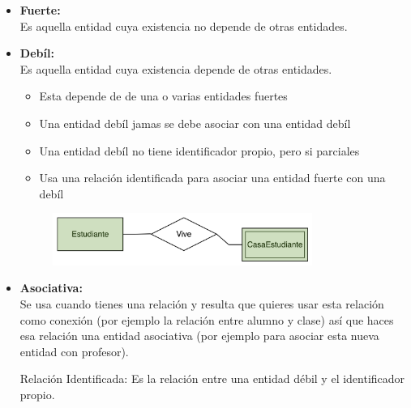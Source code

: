 \documentclass[12pt, fleqn]{report}                             %
\begin{document}
            \begin{itemize}
                \item \textbf{Fuerte:}\\
                    Es aquella entidad cuya existencia no depende de otras entidades.
                \item 
                    \textbf{Debíl:}\\
                    Es aquella entidad cuya existencia depende de otras entidades.
                    \begin{itemize}
                        \item Esta depende de de una o varias entidades fuertes
                        \item Una entidad debíl jamas se debe asociar con una entidad debíl
                        \item Una entidad debíl no tiene identificador propio, pero si parciales
                        \item Usa una relación identificada para asociar una entidad fuerte con una debíl
                    \end{itemize}

                    \begin{figure}[h]
                        \centering
                        \includegraphics[width=0.80\textwidth]{EjemploEntidadDebil}
                    \end{figure}

                \clearpage

                \item \textbf{Asociativa:}\\
                    Se usa cuando tienes una relación y resulta que quieres usar esta relación
                    como conexión (por ejemplo la relación entre alumno y clase) así que haces
                    esa relación una entidad asociativa (por ejemplo para asociar esta nueva
                    entidad con profesor).

                    Relación Identificada: Es la relación entre una entidad débil y el
                    identificador propio.


\end{itemize}
\end{document}
